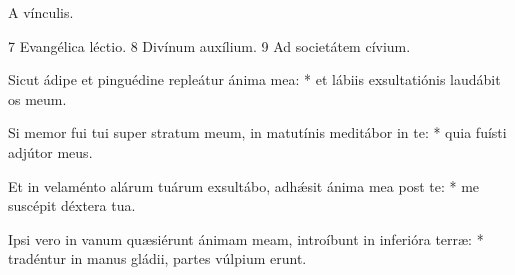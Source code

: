  A vínculis.

 7 Evangélica léctio. 8 Divínum auxílium. 9 Ad societátem cívium.

Sicut ádipe et pinguédine repleátur ánima mea: * et lábiis exsultatiónis laudábit os meum.

Si memor fui tui super stratum meum, in matutínis meditábor in te: * quia fuísti adjútor meus.

Et in velaménto alárum tuárum exsultábo, adhǽsit ánima mea post te: * me suscépit déxtera tua.

Ipsi vero in vanum quæsiérunt ánimam meam, introíbunt in inferióra terræ: * tradéntur in manus gládii, partes vúlpium erunt.

